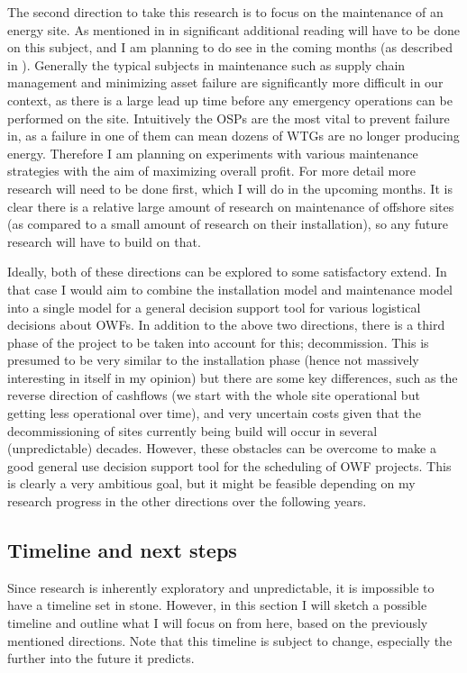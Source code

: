 \documentclass[a4paper,12pt]{article}
\begin{document}
\bigskip

The second direction to take this research is to focus on the maintenance of an energy site. As mentioned in  in significant additional reading will have to be done on this subject, and I am planning to do see in the coming months (as described in ). Generally the typical subjects in maintenance such as supply chain management and minimizing asset failure are significantly more difficult in our context, as there is a large lead up time before any emergency operations can be performed on the site. Intuitively the OSPs are the most vital to prevent failure in, as a failure in one of them can mean dozens of WTGs are no longer producing energy. Therefore I am planning on experiments with various maintenance strategies with the aim of maximizing overall profit. For more detail more research will need to be done first, which I will do in the upcoming months. It is clear there is a relative large amount of research on maintenance of offshore sites (as compared to a small amount of research on their installation), so any future research will have to build on that.

\bigskip

Ideally, both of these directions can be explored to some satisfactory extend. In that case I would aim to combine the installation model and maintenance model into a single model for a general decision support tool for various logistical decisions about OWFs. In addition to the above two directions, there is a third phase of the project to be taken into account for this; decommission. This is presumed to be very similar to the installation phase (hence not massively interesting in itself in my opinion) but there are some key differences, such as the reverse direction of cashflows (we start with the whole site operational but getting less operational over time), and very uncertain costs given that the decommissioning of sites currently being build will occur in several (unpredictable) decades. However, these obstacles can be overcome to make a good general use decision support tool for the scheduling of OWF projects. This is clearly a very ambitious goal, but it might be feasible depending on my research progress in the other directions over the following years. 

\bigskip

\subsection{Timeline and next steps} \label{ss:timel}
Since research is inherently exploratory and unpredictable, it is impossible to have a timeline set in stone. However, in this section I will sketch a possible timeline and outline what I will focus on from here, based on the previously mentioned directions. Note that this timeline is subject to change, especially the further into the future it predicts. 
\end{document}
